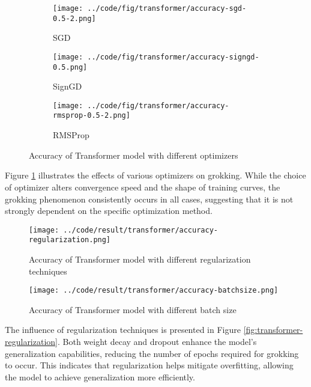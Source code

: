 \documentclass{article}
\begin{document}
\begin{figure}[ht]
    \centering
    \begin{subfigure}{0.3\textwidth}
        \texttt{[image: ../code/fig/transformer/accuracy-sgd-0.5-2.png]}
        \caption{SGD}
    \end{subfigure}
    \begin{subfigure}{0.3\textwidth}
        \texttt{[image: ../code/fig/transformer/accuracy-signgd-0.5.png]}
        \caption{SignGD}
    \end{subfigure}
    \begin{subfigure}{0.3\textwidth}
        \texttt{[image: ../code/fig/transformer/accuracy-rmsprop-0.5-2.png]}
        \caption{RMSProp}
    \end{subfigure}
    \caption{Accuracy of Transformer model with different optimizers}
    \label{fig:transformer-optimizer}
\end{figure}

Figure \ref{fig:transformer-optimizer} illustrates the effects of various optimizers on grokking. While the choice of optimizer alters convergence speed and the shape of training curves, the grokking phenomenon consistently occurs in all cases, suggesting that it is not strongly dependent on the specific optimization method.

\begin{figure}[htbp]
    \centering
    \begin{minipage}[t]{0.45\textwidth}
        \centering
        \texttt{[image: ../code/result/transformer/accuracy-regularization.png]}
        \caption{Accuracy of Transformer model with different regularization techniques}
        \label{fig:transformer-regularization}
    \end{minipage}
    \hspace{0.05\textwidth}
    \begin{minipage}[t]{0.45\textwidth}
        \centering
        \texttt{[image: ../code/result/transformer/accuracy-batchsize.png]}
        \caption{Accuracy of Transformer model with different batch size}
        \label{fig:transformer-batchsize}
    \end{minipage}
\end{figure}

The influence of regularization techniques is presented in Figure \ref{fig:transformer-regularization}. Both weight decay and dropout enhance the model's generalization capabilities, reducing the number of epochs required for grokking to occur. This indicates that regularization helps mitigate overfitting, allowing the model to achieve generalization more efficiently.
\end{document}
